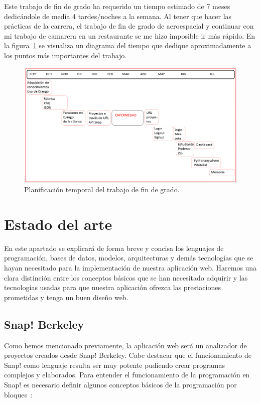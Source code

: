 \documentclass[a4paper, 12pt]{book}
\begin{document}
Este trabajo de fin de grado ha requerido un tiempo estimado de 7 meses dedicándole de media 4 tardes/noches a la semana. Al tener que hacer las prácticas de la carrera, el trabajo de fin de grado de aeroespacial y continuar con mi trabajo de camarera en un restaurante se me hizo imposible ir más rápido. En la figura~\ref{figura:tiempo} se visualiza un diagrama del tiempo que dedique aproximadamente a los puntos más importantes del trabajo. 
 \begin{figure}[h]
		\centering
		\includegraphics[scale=0.45]{img/tiempo.PNG}
		\caption{Planificación temporal del trabajo de fin de grado.}
		\label{figura:tiempo}
	    \end{figure}





\cleardoublepage
\chapter{Estado del arte}
\label{chap:estado}

En este apartado se explicará de forma breve y concisa los lenguajes de programación, bases de datos, modelos, arquitecturas y demás tecnologías que se hayan necesitado para la implementación de nuestra aplicación web. Haremos una clara distinción entre los conceptos básicos que se han necesitado adquirir y las tecnologías usadas para que nuestra aplicación ofrezca las prestaciones prometidas y tenga un buen diseño web.

\section{Snap! Berkeley}
Como hemos mencionado previamente, la aplicación web será un analizador de proyectos creados desde Snap! Berkeley. Cabe destacar que el funcionamiento de Snap! como lenguaje resulta ser muy potente pudiendo crear programas complejos y elaborados. Para entender el funcionamiento de la programación en Snap! es necesario definir algunos conceptos básicos de la programación por bloques~\cite{harvey2017snap}:
\end{document}
